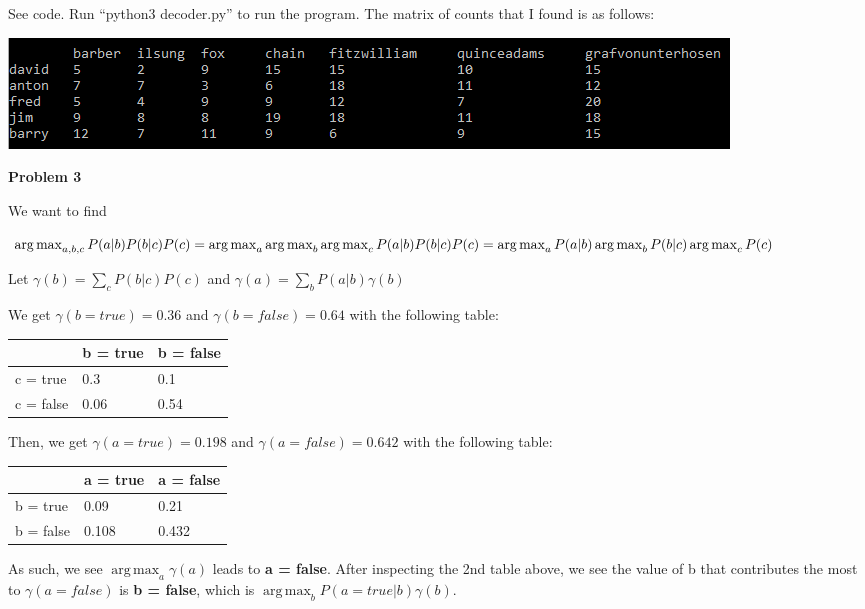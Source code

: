 \documentclass[12pt]{article}
\DeclareMathOperator*{\argmax}{arg\,max}
\begin{document}
See code. Run ``python3 decoder.py'' to run the program. The matrix of counts that I found is as follows:

\includegraphics[scale=0.9]{q2-matrix}

\pagebreak\textbf{Problem 3}

We want to find 

$\argmax_{a, b, c} P(a\vert b)P(b\vert c)P(c) \\
= \argmax_{a}\argmax_{b}\argmax_{c} P(a\vert b)P(b\vert c)P(c) \\
= \argmax_{a}P(a\vert b)\argmax_{b}P(b\vert c)\argmax_{c} P(c)$

Let $\gamma(b) = \sum_c P(b\vert c)P(c)$ and $\gamma(a) = \sum_b P(a \vert b)\gamma(b)$

We get $\gamma(b = true) = 0.36$ and $\gamma(b = false) = 0.64$ with the following table:

\begin{table}[h]
	\begin{tabular}{|l|l|l|}
		\hline
		& b = true & b = false \\ \hline
		c = true  & 0.3      & 0.1       \\ \hline
		c = false & 0.06     & 0.54      \\ \hline
	\end{tabular}
\end{table}

Then, we get $\gamma(a = true) = 0.198$ and $\gamma(a = false) = 0.642$ with the following table:

\begin{table}[h]
	\begin{tabular}{|l|l|l|}
		\hline
		& a = true & a = false \\ \hline
		b = true  & 0.09      & 0.21       \\ \hline
		b = false & 0.108     & 0.432      \\ \hline
	\end{tabular}
\end{table}

As such, we see $\argmax_a \gamma(a)$ leads to \textbf{a = false}. After inspecting the 2nd table above, we see the value of b that contributes the most to $\gamma(a = false)$ is \textbf{b = false}, which is $\argmax_b P(a = true \vert b)\gamma(b)$.
\end{document}
